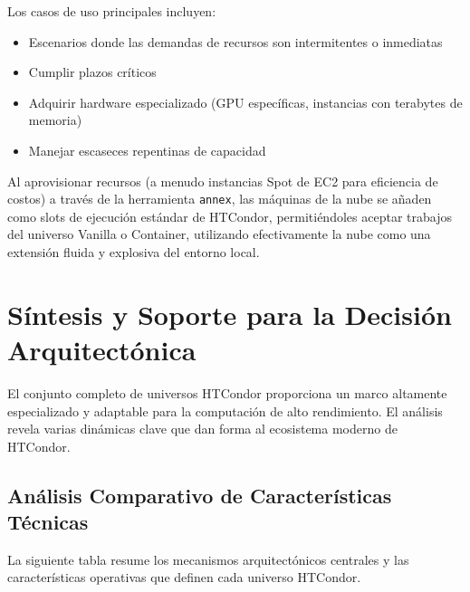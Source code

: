Los casos de uso principales incluyen:

\begin{itemize}
	\item Escenarios donde las demandas de recursos son intermitentes o inmediatas
	\item Cumplir plazos críticos
	\item Adquirir hardware especializado (GPU específicas, instancias con terabytes de memoria)
	\item Manejar escaseces repentinas de capacidad
\end{itemize}

Al aprovisionar recursos (a menudo instancias Spot de EC2 para eficiencia de costos) a través de la herramienta \texttt{annex}, las máquinas de la nube se añaden como slots de ejecución estándar de HTCondor, permitiéndoles aceptar trabajos del universo Vanilla o Container, utilizando efectivamente la nube como una extensión fluida y explosiva del entorno local.

\section{Síntesis y Soporte para la Decisión Arquitectónica}

El conjunto completo de universos HTCondor proporciona un marco altamente especializado y adaptable para la computación de alto rendimiento. El análisis revela varias dinámicas clave que dan forma al ecosistema moderno de HTCondor.

\subsection{Análisis Comparativo de Características Técnicas}

La siguiente tabla resume los mecanismos arquitectónicos centrales y las características operativas que definen cada universo HTCondor.

